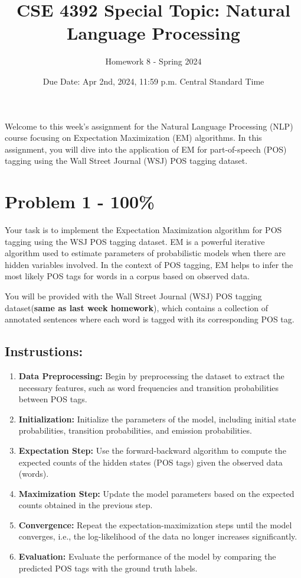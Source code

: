 \documentclass{article}
\begin{document}
\title{CSE 4392 Special Topic: Natural Language Processing}
\author{Homework 8 - Spring 2024}
\date{Due Date: Apr 2nd, 2024, 11:59 p.m. Central Standard Time}
\maketitle
\thispagestyle{fancy}


Welcome to this week's assignment for the Natural Language Processing (NLP) course focusing on Expectation Maximization (EM) algorithms. In this assignment, you will dive into the application of EM for part-of-speech (POS) tagging using the Wall Street Journal (WSJ) POS tagging dataset.
\section*{Problem 1 - 100\%}

Your task is to implement the Expectation Maximization algorithm for POS tagging using the WSJ POS tagging dataset. EM is a powerful iterative algorithm used to estimate parameters of probabilistic models when there are hidden variables involved. In the context of POS tagging, EM helps to infer the most likely POS tags for words in a corpus based on observed data.

You will be provided with the Wall Street Journal (WSJ) POS tagging dataset(\textbf{same as last week homework}), which contains a collection of annotated sentences where each word is tagged with its corresponding POS tag.

\subsection*{Instrustions:}
\begin{enumerate}
    \item \textbf{Data Preprocessing:} Begin by preprocessing the dataset to extract the necessary features, such as word frequencies and transition probabilities between POS tags.
    \item \textbf{Initialization:} Initialize the parameters of the model, including initial state probabilities, transition probabilities, and emission probabilities.
    \item \textbf{Expectation Step:} Use the forward-backward algorithm to compute the expected counts of the hidden states (POS tags) given the observed data (words).
    \item \textbf{Maximization Step:} Update the model parameters based on the expected counts obtained in the previous step.
    \item \textbf{Convergence:} Repeat the expectation-maximization steps until the model converges, i.e., the log-likelihood of the data no longer increases significantly.
    \item \textbf{Evaluation:} Evaluate the performance of the model by comparing the predicted POS tags with the ground truth labels.
\end{enumerate}
\end{document}

